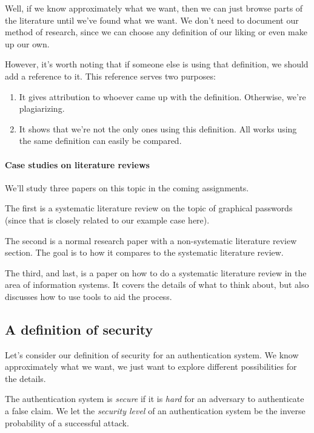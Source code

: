 Well, if we know approximately what we want, then we can just browse parts of 
the literature until we've found what we want.
We don't need to document our method of research, since we can choose any 
definition of our liking or even make up our own.

However, it's worth noting that if someone else is using that definition, we 
should add a reference to it.
This reference serves two purposes:
\begin{enumerate}
  \item It gives attribution to whoever came up with the definition.
    Otherwise, we're plagiarizing.
  \item It shows that we're not the only ones using this definition.
    All works using the same definition can easily be compared.
\end{enumerate}

\paragraph{Case studies on literature reviews}

We'll study three papers on this topic in the coming assignments.

The first\autocite{GraphicalPasswordsSurvey} is a systematic literature review 
on the topic of graphical passwords (since that is closely related to our 
example case here).

The second\autocite{OfPasswordsAndPeople} is a normal research paper with a 
non-systematic literature review section.
The goal is to how it compares to the systematic literature review.

The third, and last, is a paper on how to do a systematic literature review in 
the area of information systems\autocite{SLRinIS}.
It covers the details of what to think about, but also discusses how to use 
tools to aid the process.

\subsection{A definition of security}

Let's consider our definition of security for an authentication system.
We know approximately what we want, we just want to explore different 
possibilities for the details.

\begin{frame}
\begin{definition}
  The authentication system is \emph{secure} if it is \emph{hard} for an 
  adversary to authenticate a false claim.
  We let the \emph{security level} of an authentication system be the inverse 
  probability of a successful attack.
\end{definition}
\end{frame}

